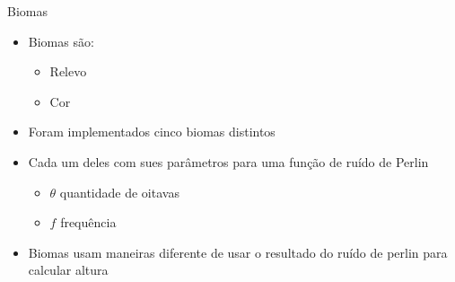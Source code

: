 \begin{frame}{Biomas}
    \begin{itemize} \setlength\itemsep{1em}
        \item Biomas são:
        \begin{itemize}
            \item Relevo
            \item Cor
        \end{itemize}
        \item Foram implementados cinco biomas distintos
        \item Cada um deles com sues parâmetros para uma função de ruído de Perlin
        \begin{itemize}
            \item $\theta$ quantidade de oitavas
            \item $f$ frequência
        \end{itemize}
        \item Biomas usam maneiras diferente de usar o resultado
        do ruído de perlin para calcular altura
    \end{itemize}
    
    
    
\end{frame}

